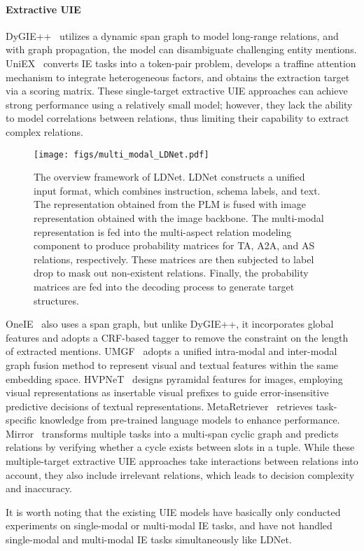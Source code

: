 \paragraph{Extractive UIE} DyGIE++~\citep{dygiepp} utilizes a dynamic span graph to model long-range relations, and with graph propagation, the model can disambiguate challenging entity mentions.
UniEX~\citep{uniex} converts IE tasks into a token-pair problem, develops a traffine attention mechanism to integrate heterogeneous factors, and obtains the extraction target via a scoring matrix. These single-target extractive UIE approaches can achieve strong performance using a relatively small model; however, they lack the ability to model correlations between relations, thus limiting their capability to extract complex relations. 
\begin{figure*}[t]
    \centering
\texttt{[image: figs/multi\_modal\_LDNet.pdf]}
    \caption{
         The overview framework of LDNet. LDNet constructs a unified input format, which combines instruction, schema labels, and text. The representation obtained from the PLM is fused with image representation obtained with the image backbone. The multi-modal representation is fed into the multi-aspect relation modeling component to produce probability matrices for TA, A2A, and AS relations, respectively. These matrices are then subjected to label drop to mask out non-existent relations. Finally, the probability matrices are fed into the decoding process to generate target structures.
    }
    \label{fig:model-framework}
\end{figure*}

OneIE~\citep{oneie} also uses a span graph, but unlike DyGIE++, it incorporates global features and adopts a CRF-based tagger to remove the constraint on the length of extracted mentions.
UMGF~\citep{umgf} adopts a unified intra-modal and inter-modal graph fusion method to represent visual and textual features within the same embedding space.
HVPNeT~\citep{hvpnet} designs pyramidal features for images, employing visual representations as insertable visual prefixes to guide error-insensitive predictive decisions of textual representations. 
MetaRetriever~\citep{metaretrieval} retrieves task-specific knowledge from pre-trained language models to enhance performance.
Mirror~\citep{mirror} transforms multiple tasks into a multi-span cyclic graph and predicts relations by verifying whether a cycle exists between slots in a tuple. While these multiple-target extractive UIE approaches take interactions between relations into account, they also include irrelevant relations, which leads to decision complexity and inaccuracy.

It is worth noting that the existing UIE models have basically only conducted experiments on single-modal or multi-modal IE tasks, and have not handled single-modal and multi-modal IE tasks simultaneously like LDNet.